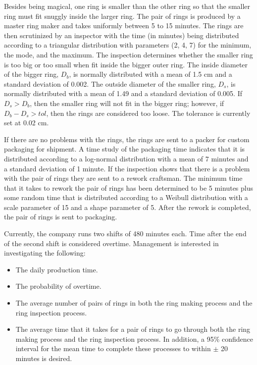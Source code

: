 \documentclass[
]{book}
\theoremstyle{definition}
\theoremstyle{definition}
\theoremstyle{definition}
\theoremstyle{definition}
\theoremstyle{remark}
\begin{document}
Besides being magical, one ring is smaller than the other ring so that
the smaller ring must fit snuggly inside the larger ring. The pair of
rings is produced by a master ring maker and takes uniformly between 5
to 15 minutes. The rings are then scrutinized by an inspector with the
time (in minutes) being distributed according to a triangular
distribution with parameters (2, 4, 7) for the minimum, the mode, and
the maximum. The inspection determines whether the smaller ring is too
big or too small when fit inside the bigger outer ring. The inside
diameter of the bigger ring, \(D_b\), is normally distributed with a mean
of 1.5 cm and a standard deviation of 0.002. The outside diameter of the
smaller ring, \(D_s\), is normally distributed with a mean of 1.49 and a
standard deviation of 0.005. If \(D_s > D_b\), then the smaller ring will
not fit in the bigger ring; however, if \(D_b - D_s > tol\), then the
rings are considered too loose. The tolerance is currently set at 0.02
cm.

If there are no problems with the rings, the rings are sent to a packer
for custom packaging for shipment. A time study of the packaging time
indicates that it is distributed according to a log-normal distribution
with a mean of 7 minutes and a standard deviation of 1 minute. If the
inspection shows that there is a problem with the pair of rings they are
sent to a rework craftsman. The minimum time that it takes to rework the
pair of rings has been determined to be 5 minutes plus some random time
that is distributed according to a Weibull distribution with a scale
parameter of 15 and a shape parameter of 5. After the rework is
completed, the pair of rings is sent to packaging.

Currently, the company runs two shifts of 480 minutes each. Time after
the end of the second shift is considered overtime. Management is
interested in investigating the following:

\begin{itemize}
\item
  The daily production time.
\item
  The probability of overtime.
\item
  The average number of pairs of rings in both the ring making process
  and the ring inspection process.
\item
  The average time that it takes for a pair of rings to go through
  both the ring making process and the ring inspection process. In
  addition, a 95\% confidence interval for the mean time to complete
  these processes to within \(\pm\) 20 minutes is desired.
\end{itemize}
\end{document}
